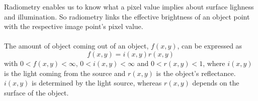 Radiometry enables us to know what a pixel value implies about surface lighness and illumination. So radiometry links the effective brightness of an object point with the respective image point's pixel value. \\ \\
The amount of object coming out of an object, $f(x,y)$, can be expressed as 
$$
	f(x,y) = i(x,y)r(x,y)
$$
with $0 < f(x,y) < \infty$, $0 < i(x,y) < \infty$ and $0 < r(x,y) < 1$, where $i(x,y)$ is the light coming from the source and $r(x,y)$ is the object's reflectance. \\
$i(x,y)$ is determined by the light source, whereas $r(x,y)$ depends on the surface of the object. \\ \\

